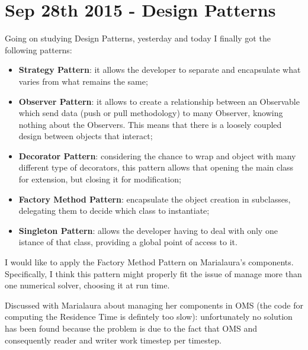 \section{Sep 28th 2015 - Design Patterns}

Going on studying Design Patterns, yesterday and today I finally got
the following patterns:

\begin{itemize}
\item \textbf{Strategy Pattern}: it allows the developer to separate
  and encapsulate what varies from what remains the same;
\item \textbf{Observer Pattern}: it allows to create a relationship
  between an Observable which send data (push or pull methodology) to
  many Observer, knowing nothing about the Observers. This means that
  there is a loosely coupled design between objects that interact;
\item \textbf{Decorator Pattern}: considering the chance to wrap and
  object with many different type of decorators, this pattern allows
  that opening the main class for extension, but closing it for
  modification;
\item \textbf{Factory Method Pattern}: encapsulate the object creation
  in subclasses, delegating them to decide which class to instantiate;
\item \textbf{Singleton Pattern}: allows the developer having to deal
  with only one istance of that class, providing a global point of
  access to it.
\end{itemize}

I would like to apply the Factory Method Pattern on Marialaura's
components. Specifically, I think this pattern might properly fit the
issue of manage more than one numerical solver, choosing it at run
time.

\par\medskip

Discussed with Marialaura about managing her components in OMS (the
code for computing the Residence Time is defintely too slow):
unfortunately no solution has been found because the problem is due to
the fact that OMS and consequently reader and writer work timestep per
timestep.
